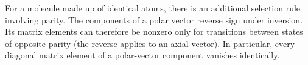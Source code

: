 For a molecule made up of identical atoms, there is an additional selection rule involving parity.
The components of a polar vector reverse sign under inversion.
Its matrix elements can therefore be nonzero only for transitions between states of opposite parity (the reverse applies to an axial vector).
In particular, every diagonal matrix element of a polar-vector component vanishes identically.
